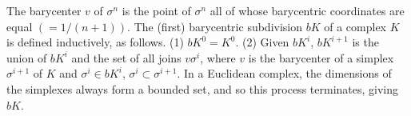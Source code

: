 The barycenter $v$ of $\sigma^n$ is the point of $\sigma^n$ all of whose barycentric coordinates are equal $(= 1/(n+1))$. The (first) barycentric subdivision $bK$ of a complex $K$ is defined inductively, as follows. (1) $bK^0 = K^0$. (2) Given $bK^i$, $bK^{i+1}$ is the union of $bK^i$ and the set of all joins $v\sigma^i$, where $v$ is the barycenter of a simplex $\sigma^{i+1}$ of $K$ and $\sigma^i \in bK^i$, $\sigma^i \subset \sigma^{i+1}$. In a Euclidean complex, the dimensions of the simplexes always form a bounded set, and so this process terminates, giving $bK$.
